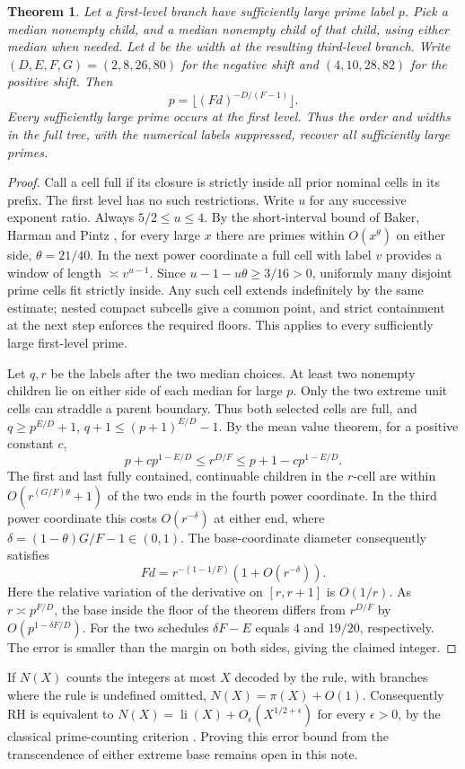 \documentclass[11pt]{article}
\newtheorem{theorem}{Theorem}
\newcommand{\floor}[1]{\lfloor #1\rfloor}
\begin{document}
\begin{theorem}\label{th:geom}
Let a first-level branch have sufficiently large prime label $p$. Pick a median nonempty child, and a median nonempty child of that child, using either median when needed. Let $d$ be the width at the resulting third-level branch. Write $(D,E,F,G)=(2,8,26,80)$ for the negative shift and $(4,10,28,82)$ for the positive shift. Then
\[
             p=\floor{(F d)^{-D/(F-1)}}.
\]
Every sufficiently large prime occurs at the first level. Thus the order and widths in the full tree, with the numerical labels suppressed, recover all sufficiently large primes.
\end{theorem}
\begin{proof}
Call a cell full if its closure is strictly inside all prior nominal cells in its prefix. The first level has no such restrictions. Write $u$ for any successive exponent ratio. Always $5/2\le u\le4$. By the short-interval bound of Baker, Harman and Pintz \cite{bhp}, for every large $x$ there are primes within $O(x^\theta)$ on either side, $\theta=21/40$. In the next power coordinate a full cell with label $v$ provides a window of length $\asymp v^{u-1}$. Since $u-1-u\theta\ge3/16>0$, uniformly many disjoint prime cells fit strictly inside. Any such cell extends indefinitely by the same estimate; nested compact subcells give a common point, and strict containment at the next step enforces the required floors. This applies to every sufficiently large first-level prime.

Let $q,r$ be the labels after the two median choices. At least two nonempty children lie on either side of each median for large $p$. Only the two extreme unit cells can straddle a parent boundary. Thus both selected cells are full, and $q\ge p^{E/D}+1$, $q+1\le(p+1)^{E/D}-1$. By the mean value theorem, for a positive constant $c$,
\[
 p+c p^{1-E/D}\le r^{D/F}\le p+1-c p^{1-E/D}.
\]
The first and last fully contained, continuable children in the $r$-cell are within $O(r^{(G/F)\theta}+1)$ of the two ends in the fourth power coordinate. In the third power coordinate this costs $O(r^{-\delta})$ at either end, where $\delta=(1-\theta)G/F-1\in(0,1)$. The base-coordinate diameter consequently satisfies
\[
 Fd=r^{-(1-1/F)}(1+O(r^{-\delta})).
\]
Here the relative variation of the derivative on $[r,r+1]$ is $O(1/r)$. As $r\asymp p^{F/D}$, the base inside the floor of the theorem differs from $r^{D/F}$ by $O(p^{1-\delta F/D})$. For the two schedules $\delta F-E$ equals $4$ and $19/20$, respectively. The error is smaller than the margin on both sides, giving the claimed integer.
\end{proof}
If $N(X)$ counts the integers at most $X$ decoded by the rule, with branches where the rule is undefined omitted, $N(X)=\pi(X)+O(1)$. Consequently RH is equivalent to $N(X)=\operatorname{li}(X)+O_\epsilon(X^{1/2+\epsilon})$ for every $\epsilon>0$, by the classical prime-counting criterion \cite{lagarias}. Proving this error bound from the transcendence of either extreme base remains open in this note.
\end{document}
